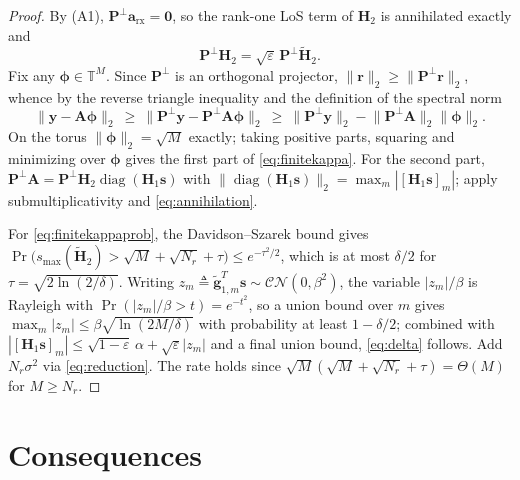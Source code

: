 \documentclass[11pt]{article}
\theoremstyle{remark}
\begin{document}
\begin{proof}
By (A1), $\mathbf{P}^{\perp}\mathbf{a}_{\mathrm{rx}}=\mathbf{0}$, so the
rank-one LoS term of $\mathbf{H}_2$ is annihilated exactly and
\begin{equation}
\mathbf{P}^{\perp}\mathbf{H}_2
=\sqrt{\varepsilon}\,\mathbf{P}^{\perp}\tilde{\mathbf{H}}_2 .
\label{eq:annihilation}
\end{equation}
Fix any $\boldsymbol{\phi}\in\mathbb{T}^{M}$. Since $\mathbf{P}^{\perp}$ is an
orthogonal projector, $\|\mathbf{r}\|_2\ge\|\mathbf{P}^{\perp}\mathbf{r}\|_2$,
whence by the reverse triangle inequality and the definition of the spectral
norm
\begin{equation}
\|\mathbf{y}-\mathbf{A}\boldsymbol{\phi}\|_2
\ \ge\ \bigl\|\mathbf{P}^{\perp}\mathbf{y}
        -\mathbf{P}^{\perp}\mathbf{A}\boldsymbol{\phi}\bigr\|_2
\ \ge\ \bigl\|\mathbf{P}^{\perp}\mathbf{y}\bigr\|_2
       -\bigl\|\mathbf{P}^{\perp}\mathbf{A}\bigr\|_2\|\boldsymbol{\phi}\|_2 .
\label{eq:revtriangle}
\end{equation}
On the torus $\|\boldsymbol{\phi}\|_2=\sqrt{M}$ exactly; taking positive parts,
squaring and minimizing over $\boldsymbol{\phi}$ gives the first part of
\eqref{eq:finitekappa}. For the second part,
$\mathbf{P}^{\perp}\mathbf{A}
 =\mathbf{P}^{\perp}\mathbf{H}_2\operatorname{diag}(\mathbf{H}_1\mathbf{s})$
with
$\|\operatorname{diag}(\mathbf{H}_1\mathbf{s})\|_2
 =\max_m|[\mathbf{H}_1\mathbf{s}]_m|$;
apply submultiplicativity and \eqref{eq:annihilation}.

For \eqref{eq:finitekappaprob}, the Davidson--Szarek bound gives
$\Pr\bigl(s_{\max}(\tilde{\mathbf{H}}_2)>\sqrt{M}+\sqrt{N_r}+\tau\bigr)
 \le e^{-\tau^2/2}$,
which is at most $\delta/2$ for $\tau=\sqrt{2\ln(2/\delta)}$. Writing
$z_m\triangleq\tilde{\mathbf{g}}_{1,m}^{T}\mathbf{s}\sim\mathcal{CN}(0,\beta^2)$,
the variable $|z_m|/\beta$ is Rayleigh with
$\Pr(|z_m|/\beta>t)=e^{-t^2}$, so a union bound over $m$ gives
$\max_m|z_m|\le\beta\sqrt{\ln(2M/\delta)}$ with probability at least
$1-\delta/2$; combined with
$|[\mathbf{H}_1\mathbf{s}]_m|
 \le\sqrt{1-\varepsilon}\,\alpha+\sqrt{\varepsilon}|z_m|$
and a final union bound, \eqref{eq:delta} follows. Add $N_r\sigma^2$ via
\eqref{eq:reduction}. The rate holds since
$\sqrt{M}(\sqrt{M}+\sqrt{N_r}+\tau)=\Theta(M)$ for $M\ge N_r$.
\end{proof}

\section{Consequences}
\end{document}
